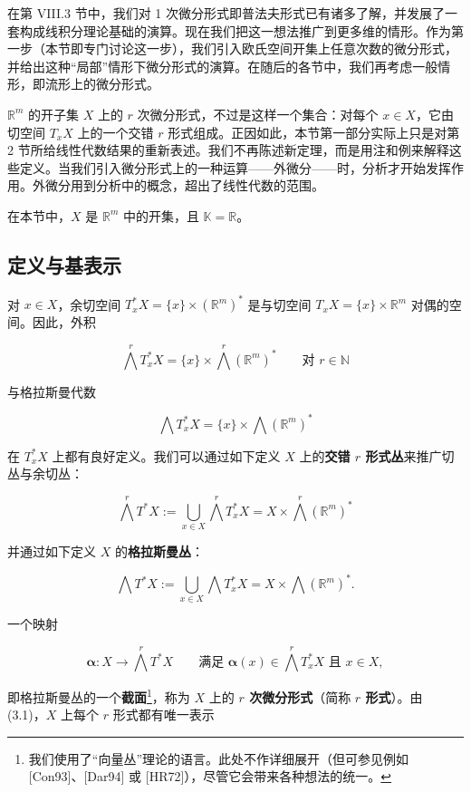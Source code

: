 在第 VIII.3 节中，我们对 1 次微分形式即普法夫形式已有诸多了解，并发展了一套构成线积分理论基础的演算。现在我们把这一想法推广到更多维的情形。作为第一步（本节即专门讨论这一步），我们引入欧氏空间开集上任意次数的微分形式，并给出这种“局部”情形下微分形式的演算。在随后的各节中，我们再考虑一般情形，即流形上的微分形式。

$ \mathbb{R}^{m} $ 的开子集 $ X $ 上的 $ r $ 次微分形式，不过是这样一个集合：对每个 $ x \in X $，它由切空间 $ T_{x}X $ 上的一个交错 $ r $ 形式组成。正因如此，本节第一部分实际上只是对第 2 节所给线性代数结果的重新表述。我们不再陈述新定理，而是用注和例来解释这些定义。当我们引入微分形式上的一种运算——外微分——时，分析才开始发挥作用。外微分用到分析中的概念，超出了线性代数的范围。

在本节中，$ X $ 是 $ \mathbb{R}^{m} $ 中的开集，且 $ \mathbb{K} = \mathbb{R} $。

\subsection*{定义与基表示}

对 $ x \in X $，余切空间 $ T_{x}^{*}X = \{x\} \times (\mathbb{R}^{m})^{*} $ 是与切空间 $ T_{x}X = \{x\} \times \mathbb{R}^{m} $ 对偶的空间。因此，外积

\begin{equation}
\bigwedge^{r} T_{x}^{*}X = \{x\} \times \bigwedge^{r}(\mathbb{R}^{m})^{*} \qquad \text{对 } r \in \mathbb{N}\tag{3.1}
\end{equation}

与格拉斯曼代数

\[
\bigwedge T_{x}^{*}X = \{x\} \times \bigwedge(\mathbb{R}^{m})^{*}
\]

在 $ T_{x}^{*}X $ 上都有良好定义。我们可以通过如下定义 $ X $ 上的\textbf{交错 $ r $ 形式丛}来推广切丛与余切丛：

\[
\bigwedge^{r} T^{*}X := \bigcup_{x \in X} \bigwedge^{r} T_{x}^{*}X = X \times \bigwedge^{r}(\mathbb{R}^{m})^{*}
\]

并通过如下定义 $ X $ 的\textbf{格拉斯曼丛}：

\[
\bigwedge T^{*}X := \bigcup_{x \in X} \bigwedge T_{x}^{*}X = X \times \bigwedge(\mathbb{R}^{m})^{*}.
\]

一个映射

\[
\boldsymbol{\alpha}: X \to \bigwedge^{r} T^{*}X \qquad \text{满足 } \boldsymbol{\alpha}(x) \in \bigwedge^{r} T_{x}^{*}X \text{ 且 } x \in X,
\]

即格拉斯曼丛的一个\textbf{截面}\footnote{我们使用了“向量丛”理论的语言。此处不作详细展开（但可参见例如 [Con93]、[Dar94] 或 [HR72]），尽管它会带来各种想法的统一。}，称为 $ X $ 上的 \textbf{$ r $ 次微分形式}（简称 \textbf{$ r $ 形式}）。由 (3.1)，$ X $ 上每个 $ r $ 形式都有唯一表示

